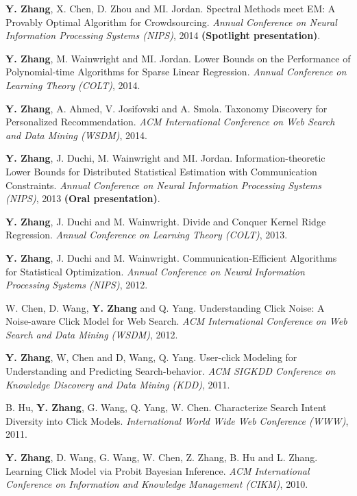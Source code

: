 \documentclass[11pt]{res} %
\begin{document}
{\begin{resume}
\begin{enumerate}[ {[C}1{]} ]
\item \textbf{Y. Zhang}, X. Chen, D. Zhou and MI. Jordan. Spectral Methods meet EM: A Provably Optimal Algorithm for Crowdsourcing.
\emph{Annual Conference on Neural Information Processing Systems (NIPS)}, 2014 {\bf (Spotlight presentation)}.

\item \textbf{Y. Zhang}, M. Wainwright and MI. Jordan. Lower Bounds on the Performance of Polynomial-time Algorithms for Sparse Linear Regression. \emph{Annual Conference on Learning Theory (COLT)}, 2014.

\item \textbf{Y. Zhang}, A. Ahmed, V. Josifovski and A. Smola. Taxonomy Discovery for Personalized Recommendation. \emph{ACM International Conference on Web Search and Data Mining (WSDM)}, 2014.

\item \textbf{Y. Zhang}, J. Duchi, M. Wainwright and MI. Jordan. Information-theoretic Lower Bounds for Distributed Statistical Estimation with Communication Constraints.
\emph{Annual Conference on Neural Information Processing Systems (NIPS)}, 2013 {\bf (Oral presentation)}.

\item  \textbf{Y. Zhang}, J. Duchi and M. Wainwright. Divide and Conquer Kernel Ridge Regression.
\emph{Annual Conference on Learning Theory (COLT)}, 2013.

\item  \textbf{Y. Zhang}, J. Duchi and M. Wainwright. Communication-Efficient Algorithms for Statistical Optimization.
\emph{Annual Conference on Neural Information Processing Systems (NIPS)}, 2012.

\item  W. Chen, D. Wang, \textbf{Y. Zhang} and Q. Yang. Understanding Click Noise: A Noise-aware Click Model for Web Search.
\emph{ACM International Conference on Web Search and Data Mining (WSDM)}, 2012.

\item  \textbf{Y. Zhang}, W, Chen and D, Wang, Q. Yang. User-click Modeling for Understanding and Predicting Search-behavior.
\emph{ACM SIGKDD Conference on Knowledge Discovery and Data Mining (KDD)}, 2011.

\item B. Hu, \textbf{Y. Zhang}, G. Wang, Q. Yang, W. Chen. Characterize Search Intent Diversity into Click Models.
\emph{International World Wide Web Conference (WWW)}, 2011.


\item \textbf{Y. Zhang}, D. Wang, G. Wang, W. Chen, Z. Zhang, B. Hu and L. Zhang. Learning Click Model via Probit Bayesian Inference.
\emph{ACM International Conference on Information and Knowledge Management (CIKM)}, 2010.


\end{enumerate}
\end{resume}}
\end{document}
